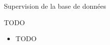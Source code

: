 
\begin{frame}[fragile]{Supervision de la base de données}

   TODO

\begin{itemize}

   \item TODO

\end{itemize}

\begin{toile}
\end{toile}

\end{frame}


\newlength{\largeurtableau}
\setlength{\largeurtableau}{\textwidth}
\addtolength{\largeurtableau}{-2\leftmarginii}


